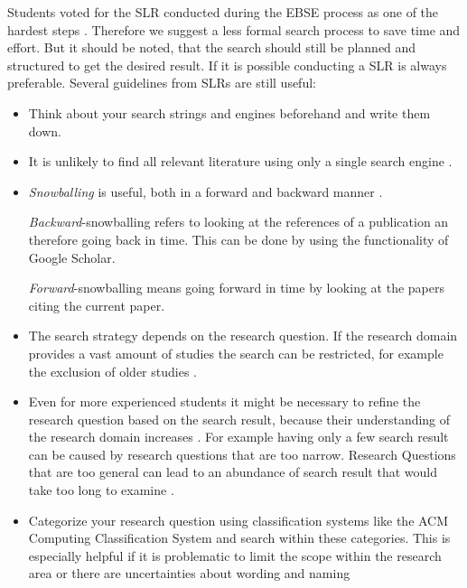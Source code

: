 Students voted for the SLR conducted during the EBSE process as one of the hardest steps \cite{keele2007}. Therefore we suggest a less formal search process to save time and effort. But it should be noted, that the search should still be planned and structured to get the desired result. If it is possible conducting a SLR is always preferable.
\newline
\newline
Several guidelines from SLRs are still useful:
\begin{itemize}
\item Think about your search strings and engines beforehand and write them down.
\item It is unlikely to find all relevant literature using only a single search engine \cite{Brereton2007}. 
\item \emph{Snowballing} is useful, both in a forward and backward manner \cite{Wohlin2014}.

\emph{Backward}-snowballing refers to looking at the references of a publication an therefore going back in time. This can be done by using the  functionality of Google Scholar.

\emph{Forward}-snowballing means going forward in time by looking at the papers citing the current paper.
\item The search strategy depends on the research question. If the research domain provides a vast amount of studies the search can  be restricted, for example the exclusion of older studies \cite{Brereton2007}.
\item Even for more experienced students it might be necessary to refine the research question based on the search result, because their understanding of the research domain increases \cite{Brereton2007}. For example having only a few search result can be caused by research questions that are too narrow. Research Questions that are too general can lead to an abundance of search result that would take too long to examine . 
\item Categorize your research question using classification systems like the ACM Computing Classification System and search within these categories. This is especially helpful if it is problematic to limit the scope within the research area or there are uncertainties about wording and naming
\end{itemize} 

